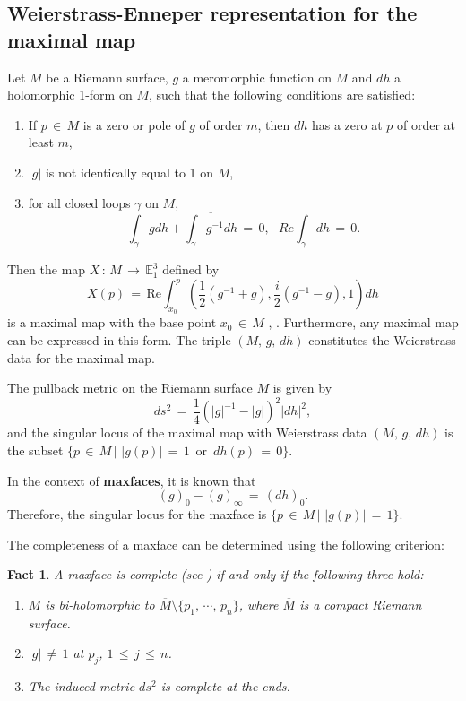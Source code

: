 \documentclass[12pt,epsfig,tikz,multi]{amsart}
\newtheorem{fact}[theorem]{Fact}
\numberwithin{equation}{section}
\begin{document}
\subsection{Weierstrass-Enneper representation for the maximal map}\label{weirstrassdata}
Let $M$ be a Riemann surface, $g$ a meromorphic function on $M$ and $dh$ a holomorphic 1-form on $M$, such
that the following conditions are satisfied:
\begin{enumerate}
\item If $p\,\in\, M$ is a zero or pole of $g$ of order $m$, then $dh$ has a zero at $p$ of order at least $m$,

\item $|g|$ is not identically equal to 1 on $M$,

\item for all closed loops $\gamma$ on $M$,
    \begin{equation}\label{PeriodProblem}
    \int_{\gamma}gdh+\overline{\int_{\gamma}g^{-1}dh}\,=\,0,\ \ \  Re\int_{\gamma}dh\,=\,0.
    \end{equation} 
\end{enumerate}
Then the map $X\,:\, M\, \longrightarrow\, \mathbb E_1^3$ defined by
\begin{equation}\label{maximal_map}
X(p)\,=\,\text{Re}\int_{x_0}^p\left( \frac{1}{2}(g^{-1} + g), \frac{ i }{2}(g^{-1} - g), 1 \right) dh
\end{equation}
is a maximal map with the base point $x_0\,\in\, M$ \cite{Estudillo1992}, \cite{UMEHARA2006}. Furthermore, any
maximal map can be expressed in this form. The triple $(M,\,g,\, dh)$ constitutes the Weierstrass data
for the maximal map. 

The pullback metric on the Riemann surface $M$ is given by 
$$ds^2\,=\,\frac{1}{4}\left(|g|^{-1}-|g|\right)^2|dh|^2,$$ and the singular locus of the maximal map with
Weierstrass data $(M,\,g,\, dh)$ is the subset $\{p\,\in\, M\,\big\vert\,\, |g(p)|\,=\,1\, \text{ or }\,
dh(p)\,=\,0\}$.

In the context of \textbf{maxfaces}, it is known that
\begin{equation}\label{divisor}(g)_0-(g)_\infty\,=\, (dh)_0.\end{equation}
Therefore, the singular locus for the maxface is $\{p\,\in\, M\,\big\vert\,\, |g(p)|\,=\,1 \}$.

The completeness of a maxface can be determined using the following criterion:
\begin{fact}
A maxface is complete (see \cite[Corollary 4.8]{UMEHARA2006}) if and only if the following three hold:
\begin{enumerate}
\item $M$ is bi-holomorphic to $\overline{M}\setminus\{p_1,\, \cdots,\, p_n\}$, where $\overline{M}$ is a compact Riemann surface\color{black}.
\item $|g|\,\neq\, 1$ at $p_j$, $1\,\leq\, j\,\leq\, n$.
\item The induced metric $ds^2$ is complete at the ends.
\end{enumerate}
\end{fact}
\end{document}
